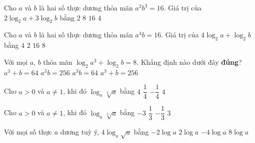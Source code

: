 \begin{ex}%
	[Mã 103 2019] Cho $a$ và $b$ là hai số thực dương thỏa mãn $a^2b^3=16$.  Giá trị của $2\log_2a+3\log_2b$ bằng
	 \choice
		{$2$} 
		{$8$} 
		{$16$} 
		 {\True $4$}
\end{ex}

\begin{ex}%
	[Mã 101  2019] Cho $a$ và $b$ là hai số thực dương thỏa mãn $a^4b=16$. Giá trị của $4\log_2a+\log_2b$ bằng
	\choice 
		{\True  $4$}
		{$2$} 
		{$16$} 
		{$8$} 
\end{ex}

\begin{ex}%
	[MĐ 102 2020-2021 - ĐỢT  1] Với mọi $a$, $b$ thỏa mãn $\log _2a^3+\log_2b=8$. Khẳng định nào dưới đây \textbf{đúng}?
	\choice 
		{$a^3+b=64$} 
		 {\True $a^3b=256$}
		 {$a^3b=64$}
		{$a^3+b=256$} 
\end{ex}

\begin{ex}%
	Cho $a>0$ và $a\ne 1$,  khi đó $\log_a\sqrt[4]{a}$ bằng
	\choice 
		 {$4$}
		{\True  $\dfrac{1}{4}$}
		{$-\dfrac{1}{4}$} 
		 {$4$}
\end{ex}

\begin{ex}%
	[MĐ 102 2020-2021 - ĐỢT 1] Cho $a>0$ và $a\ne  1$, khi đó $\log_a\sqrt[3]{a}$ bằng
	 \choice
		 {$-3$}
		{\True $\dfrac{1}{3}$} 
		{$-\dfrac{1}{3}$} 
		 {$3$}
\end{ex}

\begin{ex}%
	Với mọi số thực $a$ dương tuỳ  ý, $4\log_a \sqrt{a}$ bằng
	\choice 
		{$-2\log  a$}
		{\True $2\log  a$}
		{$-4\log  a$}
		 {$8\log a$}
\end{ex}

